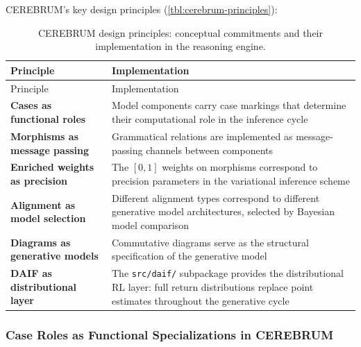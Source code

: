 \documentclass[
]{article}
\begin{document}
CEREBRUM's key design principles (\autoref{tbl:cerebrum-principles}):

\begin{longtable}[]{@{}
  >{\raggedright\arraybackslash}p{}
  >{\raggedright\arraybackslash}p{}@{}}
\caption{CEREBRUM design principles: conceptual commitments and their
implementation in the reasoning
engine.}\label{tbl:cerebrum-principles}\tabularnewline
\toprule\noalign{}
\begin{minipage}[b]{\linewidth}\raggedright
Principle
\end{minipage} & \begin{minipage}[b]{\linewidth}\raggedright
Implementation
\end{minipage} \\
\midrule\noalign{}
\endfirsthead
\toprule\noalign{}
\begin{minipage}[b]{\linewidth}\raggedright
Principle
\end{minipage} & \begin{minipage}[b]{\linewidth}\raggedright
Implementation
\end{minipage} \\
\midrule\noalign{}
\endhead
\bottomrule\noalign{}
\endlastfoot
\textbf{Cases as functional roles} & Model components carry case
markings that determine their computational role in the inference
cycle \\
\textbf{Morphisms as message passing} & Grammatical relations are
implemented as message-passing channels between components \\
\textbf{Enriched weights as precision} & The \([0,1]\) weights on
morphisms correspond to precision parameters in the variational
inference scheme \\
\textbf{Alignment as model selection} & Different alignment types
correspond to different generative model architectures, selected by
Bayesian model comparison \\
\textbf{Diagrams as generative models} & Commutative diagrams serve as
the structural specification of the generative model \\
\textbf{DAIF as distributional layer} & The \texttt{src/daif/}
subpackage provides the distributional RL layer: full return
distributions replace point estimates throughout the generative cycle \\
\end{longtable}

\subsubsection{Case Roles as Functional Specializations in
CEREBRUM}\label{case-roles-as-functional-specializations-in-cerebrum}
\end{document}
